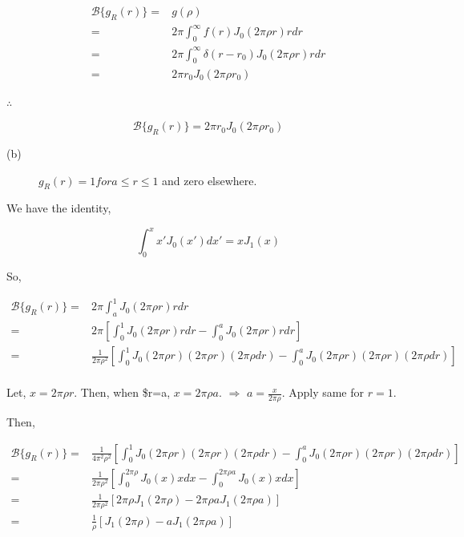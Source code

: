 \documentclass[a4paper,11pt]{article}
\begin{document}
\begin{equation*}
\begin{split}
\mathcal{B}\{g_R(r)\} = & g(\rho) \\
= & 2\pi\int_0^\infty f(r)J_0\left(2\pi \rho r\right) rdr \\
= & 2\pi\int_0^\infty \delta(r-r_0)J_0\left(2\pi \rho r\right) rdr \\
= & 2\pi r_0J_0\left(2\pi \rho r_0\right)
\end{split}
\end{equation*}

\(\therefore\)

$$\mathcal{B}\{g_R(r)\} = 2\pi r_0J_0\left(2\pi \rho r_0\right) $$

\begin{description}
\item[{(b)}] \(g_R(r) = 1 for a\leq r \leq 1\) and zero elsewhere.
\end{description}

We have the identity,

\begin{equation}
\label{eq:orgae3051c}
\int_0^x x'J_0(x') dx' = xJ_1(x)
\end{equation}

So,

\begin{equation*}
\begin{split}
\mathcal{B}\{g_R(r)\} = & 2\pi \int_a^1 J_0\left(2\pi \rho r\right) rdr \\
= & 2\pi\left[ \int_0^1 J_0\left(2\pi \rho r\right) rdr -  \int_0^a J_0\left(2\pi \rho r\right) rdr\right]\\
= & \frac{1}{2\pi\rho^2}\left[ \int_0^1 J_0\left(2\pi \rho r\right) (2\pi\rho r)(2\pi\rho dr) -  \int_0^a J_0\left(2\pi \rho r\right) (2\pi\rho r)(2\pi\rho dr)\right]\\
\end{split}
\end{equation*}

Let, \(x = 2\pi\rho r\). Then, when \$r=a, \(x=2\pi\rho a\). \(\Rightarrow\) \(a=\frac{x}{2\pi\rho}\). Apply same for \(r=1\).

Then,

\begin{equation*}
\begin{split}
\mathcal{B}\{g_R(r)\} = & \frac{1}{4\pi^2\rho^2}\left[ \int_0^{1} J_0\left(2\pi \rho r\right) (2\pi\rho r)(2\pi\rho dr) -  \int_0^a J_0\left(2\pi \rho r\right) (2\pi\rho r)(2\pi\rho dr)\right]\\
= & \frac{1}{2\pi\rho^2} \left[\int_0^{2\pi\rho} J_0\left(x\right) xdx - \int_0^{2\pi\rho a} J_0\left(x\right) xdx\right] \\
= &  \frac{1}{2\pi\rho^2}\left[2\pi\rho J_1(2\pi\rho)-2\pi\rho a J_1(2\pi\rho a)\right] \\
= &  \frac{1}{\rho}\left[J_1(2\pi\rho)-a J_1(2\pi\rho a)\right]
\end{split}
\end{equation*}
\end{document}
